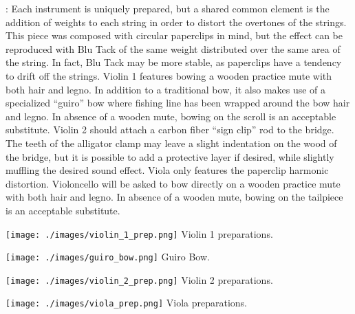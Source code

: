 \documentclass[11pt]{article}
\newcommand*\circled[1]{\tikz[baseline=(char.base)]{
            \node[shape=circle,draw,inner sep=1pt] (char) {#1};}}
\begin{document}
\begin{center}
\begin{center}
 : Each instrument is uniquely prepared, but a shared common element is the addition of weights to each string in order to distort the overtones of the strings. This piece was composed with circular paperclips in mind, but the effect can be reproduced with Blu Tack of the same weight distributed over the same area of the string. In fact, Blu Tack may be more stable, as paperclips have a tendency to drift off the strings. \circled{1} Violin 1 features bowing  a wooden practice mute with both hair and legno. In addition to a traditional bow, it also makes use of a specialized ``guiro'' bow where fishing line has been wrapped around the bow hair and legno. In absence of a wooden mute, bowing on the scroll is an acceptable substitute. \circled{2} Violin 2 should attach a carbon fiber ``sign clip'' rod to the bridge. The teeth of the alligator clamp may leave a slight indentation on the wood of the bridge, but it is possible to add a protective layer if desired, while slightly muffling the desired sound effect. \circled{3} Viola only features the paperclip harmonic distortion. \circled{4} Violoncello will be asked to bow directly on a wooden practice mute with both hair and legno. In absence of a wooden mute, bowing on the tailpiece is an acceptable substitute. 
\rightskip\leftskip
\phantom{text} \hfill \phantom{()}

\pagebreak

\begin{multicols}{2}

\texttt{[image: ./images/violin\_1\_prep.png]} Violin 1 preparations.
\rightskip\leftskip
\phantom{text} \hfill \phantom{()}


\vspace*{0.25cm}


\texttt{[image: ./images/guiro\_bow.png]} Guiro Bow.
\rightskip\leftskip
\phantom{text} \hfill \phantom{()}


\vspace*{0.25cm}

\texttt{[image: ./images/violin\_2\_prep.png]} Violin 2 preparations.
\rightskip\leftskip
\phantom{text} \hfill \phantom{()}


\vspace*{0.25cm}


\texttt{[image: ./images/viola\_prep.png]} Viola preparations.
\rightskip\leftskip
\phantom{text} \hfill \phantom{()}



\end{multicols}
\end{center}
\end{center}
\end{document}
